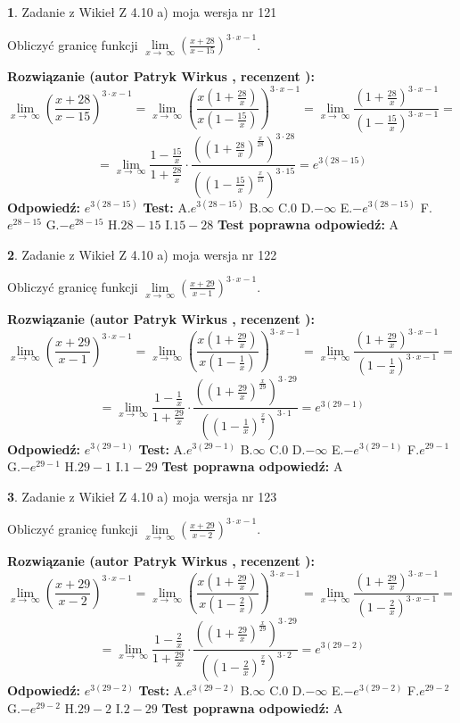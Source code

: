 \documentclass[12pt, a4paper]{article}
\theoremstyle{definition} %
\newtheorem{zad}{}
\newcommand{\zadStart}[1]{\begin{zad}#1\newline}
\newcommand{\zadStop}{\end{zad}}
\newcommand{\rozwStart}[2]{\noindent \textbf{Rozwiązanie (autor #1 , recenzent #2): }\newline}
\newcommand{\rozwStop}{\newline}
\newcommand{\odpStart}{\noindent \textbf{Odpowiedź:}\newline}
\newcommand{\odpStop}{\newline}
\newcommand{\testStart}{\noindent \textbf{Test:}\newline}
\newcommand{\testStop}{\newline}
\newcommand{\kluczStart}{\noindent \textbf{Test poprawna odpowiedź:}\newline}
\newcommand{\kluczStop}{\newline}
\begin{document}
\zadStart{Zadanie z Wikieł Z 4.10 a) moja wersja nr 121}


Obliczyć granicę funkcji  $\lim\limits_{x\to\ \infty}(\frac{x+28}{x-15})^{3\cdot x-1}$.
\zadStop
\rozwStart{Patryk Wirkus}{}
$$\lim\limits_{x\to\ \infty}(\frac{x+28}{x-15})^{3\cdot x-1} = \lim\limits_{x\to\ \infty}(\frac{x(1+\frac{28}{x})}{x(1-\frac{15}{x})})^{3\cdot x-1}=\lim\limits_{x\to\ \infty}\frac{(1+\frac{28}{x})^{3\cdot x-1}}{(1-\frac{15}{x})^{3\cdot x-1}}=$$
$$=\lim\limits_{x\to\ \infty}\frac{1-\frac{15}{x}}{1+\frac{28}{x}}\cdot\frac{((1+\frac{28}{x})^{\frac{x}{28}})^{3\cdot28}}{((1-\frac{15}{x})^{\frac{x}{15}})^{3\cdot15}}=e^{3(28-15)}$$
\rozwStop
\odpStart
$e^{3(28-15)}$
\odpStop
\testStart
A.$e^{3(28-15)}$ B.$\infty$ C.$0$ D.$-\infty$ E.$-e^{3(28-15)}$
F.$e^{28-15}$ G.$-e^{28-15}$
H.$28-15$
I.$15-28$
\testStop
\kluczStart
A
\kluczStop



\zadStart{Zadanie z Wikieł Z 4.10 a) moja wersja nr 122}


Obliczyć granicę funkcji  $\lim\limits_{x\to\ \infty}(\frac{x+29}{x-1})^{3\cdot x-1}$.
\zadStop
\rozwStart{Patryk Wirkus}{}
$$\lim\limits_{x\to\ \infty}(\frac{x+29}{x-1})^{3\cdot x-1} = \lim\limits_{x\to\ \infty}(\frac{x(1+\frac{29}{x})}{x(1-\frac{1}{x})})^{3\cdot x-1}=\lim\limits_{x\to\ \infty}\frac{(1+\frac{29}{x})^{3\cdot x-1}}{(1-\frac{1}{x})^{3\cdot x-1}}=$$
$$=\lim\limits_{x\to\ \infty}\frac{1-\frac{1}{x}}{1+\frac{29}{x}}\cdot\frac{((1+\frac{29}{x})^{\frac{x}{29}})^{3\cdot29}}{((1-\frac{1}{x})^{\frac{x}{1}})^{3\cdot1}}=e^{3(29-1)}$$
\rozwStop
\odpStart
$e^{3(29-1)}$
\odpStop
\testStart
A.$e^{3(29-1)}$ B.$\infty$ C.$0$ D.$-\infty$ E.$-e^{3(29-1)}$
F.$e^{29-1}$ G.$-e^{29-1}$
H.$29-1$
I.$1-29$
\testStop
\kluczStart
A
\kluczStop



\zadStart{Zadanie z Wikieł Z 4.10 a) moja wersja nr 123}


Obliczyć granicę funkcji  $\lim\limits_{x\to\ \infty}(\frac{x+29}{x-2})^{3\cdot x-1}$.
\zadStop
\rozwStart{Patryk Wirkus}{}
$$\lim\limits_{x\to\ \infty}(\frac{x+29}{x-2})^{3\cdot x-1} = \lim\limits_{x\to\ \infty}(\frac{x(1+\frac{29}{x})}{x(1-\frac{2}{x})})^{3\cdot x-1}=\lim\limits_{x\to\ \infty}\frac{(1+\frac{29}{x})^{3\cdot x-1}}{(1-\frac{2}{x})^{3\cdot x-1}}=$$
$$=\lim\limits_{x\to\ \infty}\frac{1-\frac{2}{x}}{1+\frac{29}{x}}\cdot\frac{((1+\frac{29}{x})^{\frac{x}{29}})^{3\cdot29}}{((1-\frac{2}{x})^{\frac{x}{2}})^{3\cdot2}}=e^{3(29-2)}$$
\rozwStop
\odpStart
$e^{3(29-2)}$
\odpStop
\testStart
A.$e^{3(29-2)}$ B.$\infty$ C.$0$ D.$-\infty$ E.$-e^{3(29-2)}$
F.$e^{29-2}$ G.$-e^{29-2}$
H.$29-2$
I.$2-29$
\testStop
\kluczStart
A
\kluczStop
\end{document}

